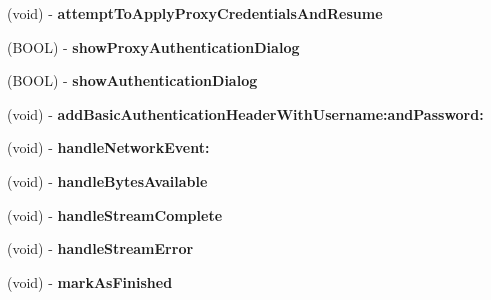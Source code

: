 \begin{DoxyCompactItemize}
\item 
\hypertarget{interface_a_s_i_h_t_t_p_request_a03ce363e92c2d5dbe7229f021b0230a5}{
(void) -\/ {\bfseries attempt\-To\-Apply\-Proxy\-Credentials\-And\-Resume}}
\label{interface_a_s_i_h_t_t_p_request_a03ce363e92c2d5dbe7229f021b0230a5}

\item 
\hypertarget{interface_a_s_i_h_t_t_p_request_ad9c4b7b0abc790e74806860c6d7a7a5b}{
(\-B\-O\-O\-L) -\/ {\bfseries show\-Proxy\-Authentication\-Dialog}}
\label{interface_a_s_i_h_t_t_p_request_ad9c4b7b0abc790e74806860c6d7a7a5b}

\item 
\hypertarget{interface_a_s_i_h_t_t_p_request_a64d812546f152b29ddd614938ffa5539}{
(\-B\-O\-O\-L) -\/ {\bfseries show\-Authentication\-Dialog}}
\label{interface_a_s_i_h_t_t_p_request_a64d812546f152b29ddd614938ffa5539}

\item 
\hypertarget{interface_a_s_i_h_t_t_p_request_a0295b7fbbc9af2be76f9dfe06f75f1ca}{
(void) -\/ {\bfseries add\-Basic\-Authentication\-Header\-With\-Username\-:and\-Password\-:}}
\label{interface_a_s_i_h_t_t_p_request_a0295b7fbbc9af2be76f9dfe06f75f1ca}

\item 
\hypertarget{interface_a_s_i_h_t_t_p_request_a271ec6e669cafa5063866022fb3577ba}{
(void) -\/ {\bfseries handle\-Network\-Event\-:}}
\label{interface_a_s_i_h_t_t_p_request_a271ec6e669cafa5063866022fb3577ba}

\item 
\hypertarget{interface_a_s_i_h_t_t_p_request_aefae44a699dc9e70b78930322cfb3558}{
(void) -\/ {\bfseries handle\-Bytes\-Available}}
\label{interface_a_s_i_h_t_t_p_request_aefae44a699dc9e70b78930322cfb3558}

\item 
\hypertarget{interface_a_s_i_h_t_t_p_request_aaf27f7d11cd1194d5087db56cc553d89}{
(void) -\/ {\bfseries handle\-Stream\-Complete}}
\label{interface_a_s_i_h_t_t_p_request_aaf27f7d11cd1194d5087db56cc553d89}

\item 
\hypertarget{interface_a_s_i_h_t_t_p_request_ab792c755bbcec55490688d2b5aa729ec}{
(void) -\/ {\bfseries handle\-Stream\-Error}}
\label{interface_a_s_i_h_t_t_p_request_ab792c755bbcec55490688d2b5aa729ec}

\item 
\hypertarget{interface_a_s_i_h_t_t_p_request_a0b812d27bc2a7ad7715e6d890923426e}{
(void) -\/ {\bfseries mark\-As\-Finished}}
\label{interface_a_s_i_h_t_t_p_request_a0b812d27bc2a7ad7715e6d890923426e}


\end{DoxyCompactItemize}
